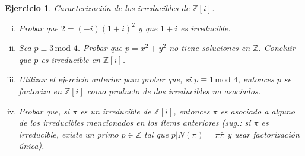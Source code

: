 \documentclass[a4paper,11pt]{article}
\newcommand{\Zm}[1]{\ensuremath{\mathbb{Z}[#1]}}
\newcommand{\Cong}[3]{\ensuremath{#1 \equiv #2 \, \textrm{mod } #3}}
\newcommand{\Div}[2]{\ensuremath{#1 | #2}}
\newtheorem*{ej}{Ejercicio}
\begin{document}
\begin{ej} 
Caracterización de los irreducibles de \Zm{i}.

\begin{enumerate}[i.]
    \item  Probar que $2 = (-i)(1+i)^2$ y que $1+i$ es irreducible.

    \item Sea \Cong{p}{3}{4}. Probar que $p = x^2 + y^2$ no tiene soluciones
    en $\mathbb{Z}$. Concluir que $p$ es irreducible en \Zm{i}.

    \item Utilizar el ejercicio anterior para probar que, si \Cong{p}{1}{4}, entonces
    $p$ se factoriza en \Zm{i} como producto de dos irreducibles no asociados.

    \item Probar que, si $\pi$ es un irreducible de \Zm{i}, entonces $\pi$ es asociado
    a alguno de los irreducibles mencionados en los ítems anteriores (sug.: si $\pi$ es
    irreducible, existe un primo $p \in \mathbb{Z}$ tal que \Div{p}{N(\pi) = \pi \bar{\pi}}
    y usar factorización única).
\end{enumerate}
\end{ej}
\end{document}
